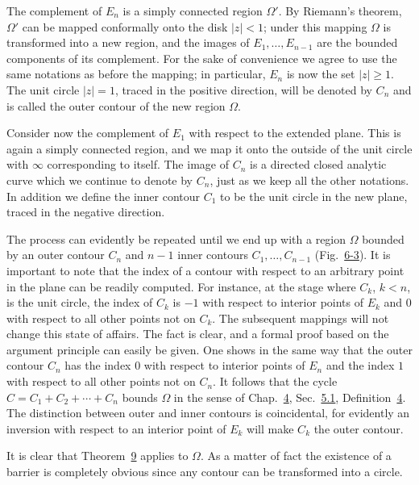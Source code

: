 The complement of $E_{n}$ is a simply connected region $\Omega'$. By Riemann's theorem, $\Omega'$ can be mapped conformally onto the disk $|z| < 1$; under this mapping $\Omega$ is transformed into a new region, and the images of $E_{1}, \ldots, E_{n-1}$ are the bounded components of its complement. For the sake of convenience we agree to use the same notations as before the mapping; in particular, $E_{n}$ is now the set $|z| \geq 1$. The unit circle $|z| = 1$, traced in the positive direction, will be denoted by $C_{n}$ and is called the outer contour of the new region $\Omega$.

Consider now the complement of $E_{1}$ with respect to the extended plane. This is again a simply connected region, and we map it onto the outside of the unit circle with $\infty$ corresponding to itself. The image of $C_{n}$ is a directed closed analytic curve which we continue to denote by $C_{n}$, just as we keep all the other notations. In addition we define the inner contour $C_{1}$ to be the unit circle in the new plane, traced in the negative direction.


The process can evidently be repeated until we end up with a region $\Omega$ bounded by an outer contour $C_n$ and $n - 1$ inner contours $C_1, \ldots, C_{n-1}$ (Fig.~\hyperref[fig:6-3]{6-3}). It is important to note that the index of a contour with respect to an arbitrary point in the plane can be readily computed. For instance, at the stage where $C_k$, $k < n$, is the unit circle, the index of $C_k$ is $-1$ with respect to interior points of $E_k$ and $0$ with respect to all other points not on $C_k$. The subsequent mappings will not change this state of affairs. The fact is clear, and a formal proof based on the argument principle can easily be given. One shows in the same way that the outer contour $C_n$ has the index $0$ with respect to interior points of $E_n$ and the index $1$ with respect to all other points not on $C_n$. It follows that the cycle $C = C_1 + C_2 + \cdots + C_n$ bounds $\Omega$ in the sense of Chap.~\hyperref[chap:4]{4}, Sec.~\hyperref[sec:4.5.1]{5.1}, Definition~\hyperref[def:4.4]{4}. The distinction between outer and inner contours is coincidental, for evidently an inversion with respect to an interior point of $E_k$ will make $C_k$ the outer contour.

It is clear that Theorem~\hyperref[thm:6.9]{9} applies to $\Omega$. As a matter of fact the existence of a barrier is completely obvious since any contour can be transformed into a circle.

